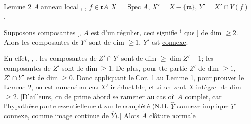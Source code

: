 
\uline{Lemme 2} \quad $A$ anneau local , , $f\in\mathfrak rA$ \quad $X=\operatorname{Spec} A$, $X'=X-\{\mathfrak m\}$, $Y'=X'\cap V(f)$.

Supposons   composantes    [, $A$ est   d'un régulier,  ceci signifie $^{\text{t}}$ que ] de dim $\geq 2$. Alors les composantes de $Y'$ sont de dim $\geq 1$, $Y'$ est \uline{connexe}.

En effet, , , les composantes de $Z'\cap Y'$ sont de dim $\geq\dim Z'-1$;   les composantes de $Z'$ sont de dim $\geq 1$. De plus, pour tte partie $Z'$ de dim $\geq 1$, $Z'\cap Y'$ est de dim $\geq 0$. Donc appliquant le Cor. 1 au Lemme 1, pour prouver le Lemme 2, on est ramené au cas $X'$  irréductible, et si on veut $X$ intègre. de dim $\geq 2$. [D'ailleurs, on  de prime abord se ramener au cas où $A$  \uline{complet}, car l'hypothèse porte essentiellement sur le complété (N.B. $\widehat Y$ connexe implique $Y$ connexe, comme image continue de $\widehat Y$).] Alors $\widetilde A$ clôture normale

